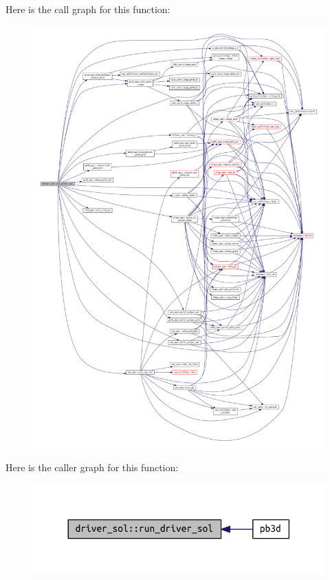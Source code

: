 Here is the call graph for this function\+:\nopagebreak
\begin{figure}[H]
\begin{center}
\leavevmode
\includegraphics[width=350pt]{namespacedriver__sol_ad3b1765b3ecc5f82129bfc683ffc6c5c_cgraph}
\end{center}
\end{figure}
Here is the caller graph for this function\+:\nopagebreak
\begin{figure}[H]
\begin{center}
\leavevmode
\includegraphics[width=330pt]{namespacedriver__sol_ad3b1765b3ecc5f82129bfc683ffc6c5c_icgraph}
\end{center}
\end{figure}
